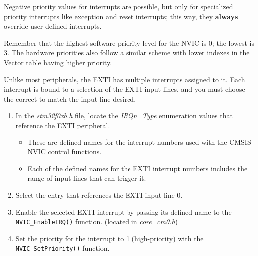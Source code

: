 \documentclass[11pt,fleqn]{book} %
\begin{document}
Negative priority values for interrupts are possible, but only for specialized priority interrupts like exception and reset interrupts; this way, they \textbf{always} override user-defined interrupts.

\begin{warning}
    Remember that the highest software priority level for the NVIC is 0; the lowest is 3. The hardware priorities also follow a similar scheme with lower indexes in the Vector table having higher priority. 
\end{warning}

\begin{exercise}
    \label{ex4}
    Unlike most peripherals, the EXTI has multiple interrupts assigned to it. Each interrupt is bound to a selection of the EXTI input lines, and you must choose the correct to match the input line desired. 
    \begin{enumerate}
        \item In the \textit{stm32f0xb.h} file, locate the \textit{IRQn\_Type} enumeration values that reference the EXTI peripheral. 
        \begin{itemize}
            \item These are defined names for the interrupt numbers used with the CMSIS NVIC control functions.
            \item Each of the defined names for the EXTI interrupt numbers includes the range of input lines that can trigger it. 
        \end{itemize}
        \item Select the entry that references the EXTI input line 0.
        \item Enable the selected EXTI interrupt by passing its defined name to the  \texttt{NVIC\_EnableIRQ()} function. (located in \textit{core\_cm0.h})
        \item Set the priority for the interrupt to 1 (high-priority) with the \texttt{NVIC\_SetPriority()} function.
    \end{enumerate}
    
\end{exercise}


\end{document}
